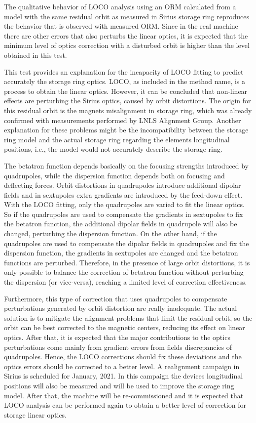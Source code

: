 The qualitative behavior of LOCO analysis using an ORM calculated from a model with the same residual orbit as measured in Sirius storage ring reproduces the behavior that is observed with measured ORM. Since in the real machine there are other errors that also perturbs the linear optics, it is expected that the minimum level of optics correction with a disturbed orbit is higher than the level obtained in this test. 

This test provides an explanation for the incapacity of LOCO fitting to predict accurately the storage ring optics. LOCO, as included in the method name, is a process to obtain the linear optics. However, it can be concluded that non-linear effects are perturbing the Sirius optics, caused by orbit distortions. The origin for this residual orbit is the magnets misalignment in storage ring, which was already confirmed with measurements performed by LNLS Alignment Group. Another explanation for these problems might be the incompatibility between the storage ring model and the actual storage ring regarding the elements longitudinal positions, i.e., the model would not accurately describe the storage ring. 

The betatron function depends basically on the focusing strengths introduced by quadrupoles, while the dispersion function depends both on focusing and deflecting forces. Orbit distortions in quadrupoles introduce additional dipolar fields and in sextupoles extra gradients are introduced by the feed-down effect. With the LOCO fitting, only the quadrupoles are varied to fit the linear optics. So if the quadrupoles are used to compensate the gradients in sextupoles to fix the betatron function, the additional dipolar fields in quadrupole will also be changed, perturbing the dispersion function. On the other hand, if the quadrupoles are used to compensate the dipolar fields in quadrupoles and fix the dispersion function, the gradients in sextupoles are changed and the betatron functions are perturbed. Therefore, in the presence of large orbit distortions, it is only possible to balance the correction of betatron function without perturbing the dispersion (or vice-versa), reaching a limited level of correction effectiveness.

Furthermore, this type of correction that uses quadrupoles to compensate perturbations generated by orbit distortion are really inadequate. The actual solution is to mitigate the alignment problems that limit the residual orbit, so the orbit can be best corrected to the magnetic centers, reducing its effect on linear optics. After that, it is expected that the major contributions to the optics perturbations come mainly from gradient errors from fields discrepancies of quadrupoles. Hence, the LOCO corrections should fix these deviations and the optics errors should be corrected to a better level. A realignment campaign in Sirius is scheduled for January, 2021. In this campaign the devices longitudinal positions will also be measured and will be used to improve the storage ring model. After that, the machine will be re-commissioned and it is expected that LOCO analysis can be performed again to obtain a better level of correction for storage linear optics.
